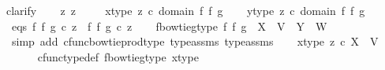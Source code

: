 \begin{isabellebody}
{\isacharparenleft}{\kern0pt}clarify{\isacharparenright}{\kern0pt}\isanewline
\ \ \isamarkupfalse%
\ z{}\ z{}\ \isanewline
\ \ \isamarkupfalse%
\ x{\isacharunderscore}{\kern0pt}type{\isacharcolon}{\kern0pt}\ {\isachardoublequoteopen}z{}\ {\isasymin}\isactrlsub c\ domain\ {\isacharparenleft}{\kern0pt}f\ {\isasymbowtie}\isactrlsub f\ g{\isacharparenright}{\kern0pt}{\isachardoublequoteclose}\isanewline
\ \ \isamarkupfalse%
\ y{\isacharunderscore}{\kern0pt}type{\isacharcolon}{\kern0pt}\ {\isachardoublequoteopen}z{}\ {\isasymin}\isactrlsub c\ domain\ {\isacharparenleft}{\kern0pt}f\ {\isasymbowtie}\isactrlsub f\ g{\isacharparenright}{\kern0pt}{\isachardoublequoteclose}\isanewline
\ \ \isamarkupfalse%
\ eqs{\isacharcolon}{\kern0pt}\ {\isachardoublequoteopen}{\isacharparenleft}{\kern0pt}f\ {\isasymbowtie}\isactrlsub f\ g{\isacharparenright}{\kern0pt}\ {\isasymcirc}\isactrlsub c\ z{}\ {\isacharequal}{\kern0pt}\ {\isacharparenleft}{\kern0pt}f\ {\isasymbowtie}\isactrlsub f\ g{\isacharparenright}{\kern0pt}\ {\isasymcirc}\isactrlsub c\ z{}{\isachardoublequoteclose}\isanewline
\isanewline
\ \ \isamarkupfalse%
\ f{\isacharunderscore}{\kern0pt}bowtie{\isacharunderscore}{\kern0pt}g{\isacharunderscore}{\kern0pt}type{\isacharcolon}{\kern0pt}\ {\isachardoublequoteopen}{\isacharparenleft}{\kern0pt}f\ {\isasymbowtie}\isactrlsub f\ g{\isacharparenright}{\kern0pt}\ {\isacharcolon}{\kern0pt}\ X\ {\isasymCoprod}\ V\ {\isasymrightarrow}\ Y\ {\isasymCoprod}\ W{\isachardoublequoteclose}\isanewline
\ \ \ \ \isamarkupfalse%
\ {\isacharparenleft}{\kern0pt}simp\ add{\isacharcolon}{\kern0pt}\ cfunc{\isacharunderscore}{\kern0pt}bowtie{\isacharunderscore}{\kern0pt}prod{\isacharunderscore}{\kern0pt}type\ type{\isacharunderscore}{\kern0pt}assms{\isacharparenleft}{\kern0pt}{}{\isacharparenright}{\kern0pt}\ type{\isacharunderscore}{\kern0pt}assms{\isacharparenleft}{\kern0pt}{}{\isacharparenright}{\kern0pt}{\isacharparenright}{\kern0pt}\isanewline
\isanewline
\ \ \isamarkupfalse%
\ x{\isacharunderscore}{\kern0pt}type{}{\isacharcolon}{\kern0pt}\ {\isachardoublequoteopen}z{}\ {\isasymin}\isactrlsub c\ X\ {\isasymCoprod}\ V{\isachardoublequoteclose}\isanewline
\ \ \ \ \isamarkupfalse%
\ cfunc{\isacharunderscore}{\kern0pt}type{\isacharunderscore}{\kern0pt}def\ f{\isacharunderscore}{\kern0pt}bowtie{\isacharunderscore}{\kern0pt}g{\isacharunderscore}{\kern0pt}type\ x{\isacharunderscore}{\kern0pt}type\ \isamarkupfalse%

\end{isabellebody}
